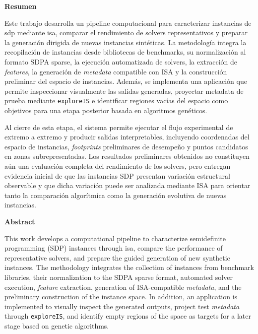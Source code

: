 \clearpage
\thispagestyle{plain}

\begin{center}
    \textbf{\Large Resumen}
\end{center}

\small
Este trabajo desarrolla un pipeline computacional para caracterizar instancias de
\acrfull{sdp} mediante \acrfull{isa}, comparar el rendimiento de solvers
representativos y preparar la generación dirigida de nuevas instancias sintéticas.
La metodología integra la recopilación de instancias desde bibliotecas de benchmarks,
su normalización al formato SDPA sparse, la ejecución automatizada de solvers, la
extracción de \textit{features}, la generación de \textit{metadata} compatible con ISA y
la construcción preliminar del espacio de instancias. Además, se implementa una
aplicación que permite inspeccionar visualmente las salidas generadas, proyectar
metadata de prueba mediante \texttt{exploreIS} e identificar regiones vacías del
espacio como objetivos para una etapa posterior basada en algoritmos genéticos.

Al cierre de esta etapa, el sistema permite ejecutar el flujo experimental de extremo
a extremo y producir salidas interpretables, incluyendo coordenadas del espacio de
instancias, \textit{footprints} preliminares de desempeño y puntos candidatos en zonas
subrepresentadas. Los resultados preliminares obtenidos no constituyen aún una evaluación completa 
del rendimiento de los solvers, pero entregan evidencia inicial de que las instancias 
SDP presentan variación estructural observable y que dicha variación puede ser analizada 
mediante ISA para orientar tanto la comparación algorítmica como la generación evolutiva 
de nuevas instancias.

\vspace{0.45cm}

\begin{center}
    \textbf{\Large Abstract}
\end{center}

This work develops a computational pipeline to characterize semidefinite programming (SDP) instances
through \acrfull{isa}, compare the performance of representative solvers, and prepare
the guided generation of new synthetic instances. The methodology integrates the
collection of instances from benchmark libraries, their normalization to the SDPA sparse
format, automated solver execution, \textit{feature} extraction, generation of
ISA-compatible \textit{metadata}, and the preliminary construction of the instance space.
In addition, an application is implemented to visually inspect the generated outputs,
project test \textit{metadata} through \texttt{exploreIS}, and identify empty regions of
the space as targets for a later stage based on genetic algorithms.

